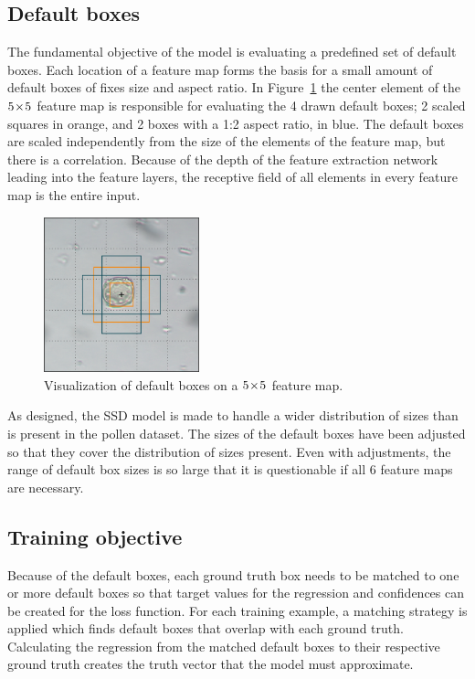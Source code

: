 \subsection{Default boxes}

The fundamental objective of the model is evaluating a predefined set of default boxes.
Each location of a feature map forms the basis for a small amount of default boxes of fixes size and aspect ratio.
In Figure~\ref{fig:defaults} the center element of the \(5\!\times \! 5\) feature map is responsible for evaluating the 4 drawn default boxes; 2 scaled squares in orange, and 2 boxes with a 1:2 aspect ratio, in blue.
The default boxes are scaled independently from the size of the elements of the feature map, but there is a correlation.
Because of the depth of the feature extraction network leading into the feature layers, the receptive field of all elements in every feature map is the entire input.%
\begin{figure}
  \centering
  \includegraphics[width=0.4\textwidth]{figs/method/default_boxes.png}
  \caption[Visualizing default boxes]{Visualization of default boxes on a \(5\!\times \! 5 \) feature map.}\label{fig:defaults}
\end{figure}

As designed, the SSD model is made to handle a wider distribution of sizes than is present in the pollen dataset.
The sizes of the default boxes have been adjusted so that they cover the distribution of sizes present.
Even with adjustments, the range of default box sizes is so large that it is questionable if all 6 feature maps are necessary.

\subsection{Training objective}
Because of the default boxes, each ground truth box needs to be matched to one or more default boxes so that target values for the regression and confidences can be created for the loss function.
For each training example, a matching strategy is applied which finds default boxes that overlap with each ground truth.
Calculating the regression from the matched default boxes to their respective ground truth creates the truth vector that the model must approximate.

